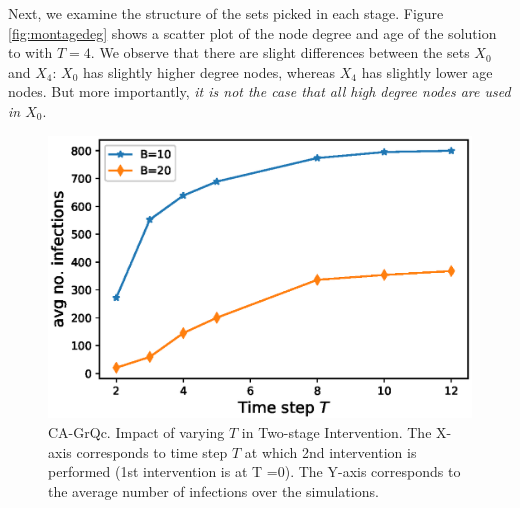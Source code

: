 Next, we examine the structure of the sets picked in each stage. Figure \ref{fig:montagedeg} shows a scatter plot of the node degree and age of the solution to \probtwo{} with $T=4$. We observe that there are slight differences between the sets $X_0$ and $X_4$: $X_0$ has slightly higher degree nodes, whereas $X_4$ has slightly lower age nodes. But more importantly, \emph{it is not the case that all high degree nodes are used in $X_0$}.
\begin{figure}[!h]
    \centering
    \includegraphics[scale = 0.45]{Figuresnew/twostage}
    \caption{CA-GrQc. Impact of varying $T$ in Two-stage Intervention. The X-axis corresponds to time step $T$ at which 2nd intervention is performed (1st intervention is at T =0). The Y-axis corresponds to the average number of infections over the simulations.}
    \label{fig:temporal}
\end{figure}

